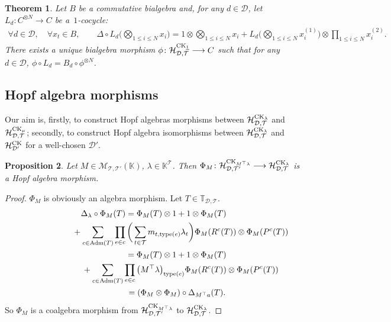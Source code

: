 \documentclass[pdftex]{sigma}
\numberwithin{equation}{section}
\newtheorem{Theorem}{Theorem}[section]
\newtheorem{Proposition}[Theorem]{Proposition}
 { \theoremstyle{definition}
\newtheorem{Definition}[Theorem]{Definition}
\newtheorem{Note}[Theorem]{Note}
\newtheorem{Example}[Theorem]{Example}
\newtheorem{Remark}[Theorem]{Remark}
\newtheorem{Notation}[Theorem]{Notation}}
\newcommand{\K}{\mathbb{K}}
\newcommand{\T}{\mathcal{T}}
\newcommand{\D}{\mathcal{D}}
\newcommand{\adm}{\mathrm{Adm}}
\newcommand{\h}{\mathcal{H}}
\newcommand{\bfT}{\mathbb{T}}
\newcommand{\M}{\mathcal{M}}
\newcommand{\type}{\mathrm{type}}
\begin{document}
\begin{Theorem} \label{theo22}
Let $B$ be a commutative bialgebra and, for any $d\in \D$, let $L_d\colon C^{\otimes N}\longrightarrow C$ be a~$1$-cocycle:
\begin{gather*}
\forall d\in \D,\quad\forall x_t\in B,\qquad
\Delta \circ L_d\Big( \bigotimes_{1\leq i \leq N} x_i\Big)
=1\otimes \bigotimes_{1\leq i \leq N} x_i+ L_d\Big( \bigotimes_{1\leq i \leq N} x_i^{(1)}\Big)
\otimes \prod_{1\leq i \leq N} x_i^{(2)}.
\end{gather*}
There exists a unique bialgebra morphism $\phi\colon \h_{\D,\T}^{{\rm CK}_{\underline{1}}}\longrightarrow C$
such that for any $d\in \D$, $\phi\circ L_d=B_d \circ\phi^{\otimes N}$.
\end{Theorem}

\subsection{Hopf algebra morphisms}

Our aim is, firstly, to construct Hopf algebras morphisms between
$\h_{\D,\T}^{{\rm CK}_\lambda}$ and $\h_{\D,\T}^{{\rm CK}_\mu}$;
secondly, to construct Hopf algebra isomorphisms between $\h_{\D,\T}^{{\rm CK}_\lambda}$
and $\h_{\D'}^{{\rm CK}}$ for a well-chosen $\D'$.

\begin{Proposition}
Let $M\in \M_{\T,\T'}(\K)$, $\lambda\in \K^{\T}$. Then $\Phi_M\colon \h_{\D,\T'}
^{{\rm CK}_{M^\top \lambda}}\longrightarrow \h_{\D,\T}^{{\rm CK}_\lambda}$ is a Hopf algebra morphism.
\end{Proposition}

\begin{proof} $\Phi_M$ is obviously an algebra morphism. Let $T\in \bfT_{\D,\T}$.
\begin{gather*}
\Delta_\lambda\circ \Phi_M(T)=\Phi_M(T)\otimes 1+1\otimes \Phi_M(T)
\\ \hphantom{\Delta_\lambda\circ \Phi_M(T)=}
{}+\sum_{c\in \adm(T)} \prod_{e\in c}\bigg(\sum_{t\in \T} m_{t,\type(e)}\lambda_t\bigg)
\Phi_M(R^c(T))\otimes \Phi_M(P^c(T))
\\ \hphantom{\Delta_\lambda\circ \Phi_M(T)}
{}=\Phi_M(T)\otimes 1+1\otimes \Phi_M(T)
\\ \hphantom{\Delta_\lambda\circ \Phi_M(T)=}
{}+\sum_{c\in \adm(T)} \prod_{e\in c}\big(M^\top \lambda\big)_{\type(e)} \Phi_M(R^c(T))\otimes \Phi_M(P^c(T))
\\ \hphantom{\Delta_\lambda\circ \Phi_M(T)}
{}=(\Phi_M\otimes \Phi_M)\circ \Delta_{M^\top a}(T).
\end{gather*}
So $\Phi_M$ is a coalgebra morphism from $\h_{\D,\T'}^{{\rm CK}_{M^\top \lambda}}$ to $\h_{\D,\T}^{{\rm CK}_\lambda}$. \end{proof}
\end{document}
